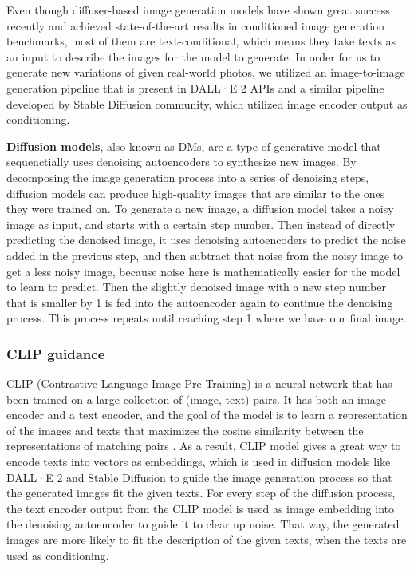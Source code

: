 \documentclass[11pt]{article}
\begin{document}
Even though diffuser-based image generation models have shown great success recently and achieved state-of-the-art results in conditioned image generation benchmarks, most of them are text-conditional, which means they take texts as an input to describe the images for the model to generate. In order for us to generate new variations of given real-world photos, we utilized an image-to-image generation pipeline that is present in DALL·E 2 APIs and a similar pipeline developed by Stable Diffusion community, which utilized image encoder output as conditioning.

\textbf{Diffusion models}, also known as DMs, are a type of generative model that sequenctially uses denoising autoencoders to synthesize new images. By decomposing the image generation process into a series of denoising steps, diffusion models can produce high-quality images that are similar to the ones they were trained on. To generate a new image, a diffusion model takes a noisy image as input, and starts with a certain step number. Then instead of directly predicting the denoised image, it uses denoising autoencoders to predict the noise added in the previous step, and then subtract that noise from the noisy image to get a less noisy image, because noise here is mathematically easier for the model to learn to predict. Then the slightly denoised image with a new step number that is smaller by 1 is fed into the autoencoder again to continue the denoising process. This process repeats until reaching step 1 where we have our final image.

\subsubsection{CLIP guidance}

CLIP (Contrastive Language-Image Pre-Training) is a neural network that has been trained on a large collection of (image, text) pairs. It has both an image encoder and a text encoder, and the goal of the model is to learn a representation of the images and texts that maximizes the cosine similarity between the representations of matching pairs \cite{radford2021learning}. As a result, CLIP model gives a great way to encode texts into vectors as embeddings, which is used in diffusion models like DALL·E 2 and Stable Diffusion to guide the image generation process so that the generated images fit the given texts. For every step of the diffusion process, the text encoder output from the CLIP model is used as image embedding into the denoising autoencoder to guide it to clear up noise. That way, the generated images are more likely to fit the description of the given texts, when the texts are used as conditioning.
\end{document}
